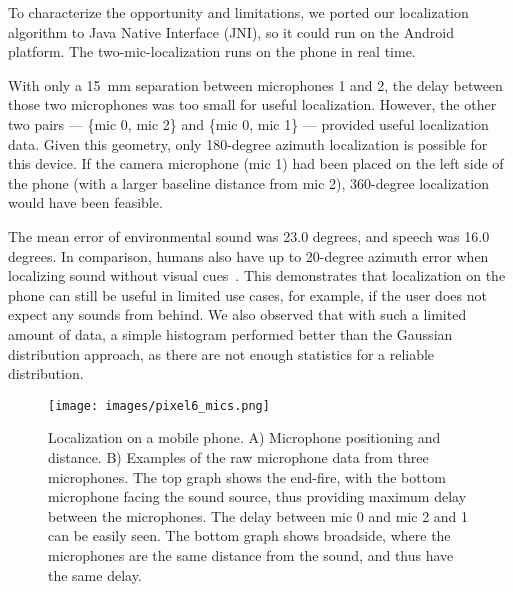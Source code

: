 To characterize the opportunity and limitations, we ported our localization algorithm to Java Native Interface (JNI), so it could run on the Android platform. The two-mic-localization runs on the phone in real time. 


With only a 15~mm separation between microphones 1 and 2, the delay between those two microphones was too small for useful localization. However, the other two pairs --- \{mic 0, mic 2\} and \{mic 0, mic 1\} --- provided useful localization data. %
Given this geometry, only 180-degree azimuth localization is possible for this device. If the camera microphone (mic 1) had been placed on the left side of the phone (with a larger baseline distance from mic 2), 360-degree localization would have been feasible. 

The mean error of environmental sound was 23.0 degrees, and speech was 16.0 degrees.  In comparison, humans also have up to 20-degree azimuth error when localizing sound without visual cues~\cite{human_localization_error}.
This demonstrates that localization on the phone can still be useful in limited use cases, for example, if the user does not expect any sounds from behind. We also observed that with such a limited amount of data, a simple histogram performed better than the Gaussian distribution approach, as there are not enough statistics for a reliable distribution. 

\begin{figure*}
  \centering
  \texttt{[image: images/pixel6\_mics.png]}
  \caption{Localization on a mobile phone. A) Microphone positioning and distance. B) Examples of the raw microphone data from three microphones. The top graph shows the end-fire, with the bottom microphone facing the sound source, thus providing maximum delay between the microphones. The delay between mic 0 and mic 2 and 1 can be easily seen. The bottom graph shows broadside, where the microphones are the same distance from the sound, and thus have the same delay.}
  \label{fig:pixel_mics}  
\end{figure*}

